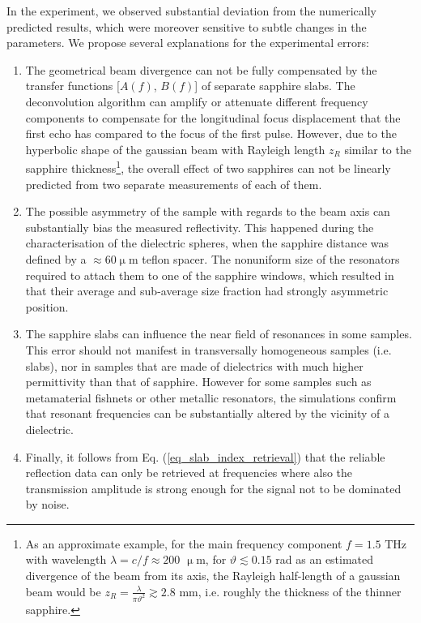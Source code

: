 In the experiment, we observed substantial deviation  %
from the numerically predicted results, which were moreover sensitive to subtle changes in the parameters. We propose  several explanations for the experimental errors:
\begin{enumerate}
\item{The geometrical beam divergence can not be fully compensated by the transfer functions [$A(f)$, $B(f)$] of separate sapphire slabs. The deconvolution algorithm can amplify or attenuate different frequency components to compensate for the  longitudinal focus displacement that the first echo has compared to the focus of the first pulse. However, due to the hyperbolic shape of the gaussian beam with Rayleigh length $z_{R}$ similar to the sapphire thickness\footnote{As an approximate example, for the main frequency component $f = 1.5$ THz with wavelength $\lambda = c / f \approx 200$ $\upmu$m, for $\vartheta \lesssim 0.15$ rad as an estimated divergence of the beam from its axis, the Rayleigh half-length of a gaussian beam would be $z_{R} = \frac{\lambda}{\pi \vartheta^{2}} \gtrsim 2.8$ mm, i.e. roughly the thickness of the thinner sapphire.}, the overall effect of two sapphires can not be linearly predicted from two separate measurements of each of them.} 
 \item{The possible asymmetry of the sample with regards to the beam axis can substantially bias the measured reflectivity. This happened during the characterisation of the dielectric spheres, when the sapphire distance was defined by a $\approx$60$\upmu$m teflon spacer. The nonuniform size of the resonators required to attach them to one of the sapphire windows, which resulted in that their average and sub-average size fraction had strongly asymmetric position. } 
 \item{The sapphire slabs can influence the near field of resonances in some samples. This error should not manifest in transversally homogeneous samples (i.e. slabs), nor in samples that are made of dielectrics with much higher permittivity than that of sapphire. However for some samples such as metamaterial fishnets or other metallic resonators, the simulations confirm that resonant frequencies can be substantially altered by the vicinity of a dielectric. }
 \item{Finally, it follows from Eq. (\ref{eq_slab_index_retrieval}) %
 that the reliable reflection data can only be retrieved at frequencies where also the transmission amplitude is strong enough for the signal not to be dominated by noise. }
 \end{enumerate}

